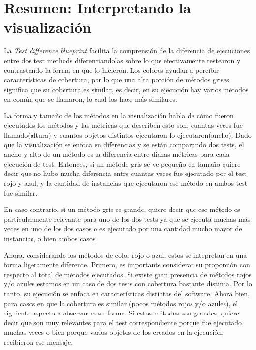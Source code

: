 
\section{Resumen: Interpretando la visualización}


\par La \emph{Test difference blueprint} facilita la comprensión de la diferencia de ejecuciones entre dos test methods diferenciandolas sobre lo que efectivamente testearon y contrastando la forma en que lo hicieron. Los colores ayudan a percibir características de cobertura, por lo que una alta porción de métodos grises significa que su cobertura es similar, es decir, en su ejecución hay varios métodos en común que se llamaron, lo cual los hace más similares.

\par La forma y tamaño de los métodos en la visualización habla de cómo fueron ejecutados los métodos y las métricas que describen esto son: cuantas veces fue llamado(altura) y cuantos objetos distintos ejecutaron lo ejecutaron(ancho). Dado que la visualización se enfoca en diferencias y se están comparando dos tests, el ancho y alto de un método es la diferencia entre dichas métricas para cada ejecución de test. Entonces, si un método gris se ve pequeño en tamaño quiere decir que no hubo mucha diferencia entre cuantas veces fue ejecutado por el test rojo y azul, y la cantidad de instancias que ejecutaron ese método en ambos test fue similar. 

\par En caso contrario, si un método gris es grande, quiere decir que ese método es particularmente relevante para uno de los dos tests ya que se ejecuta muchas más veces en uno de los dos casos o es ejecutado por una cantidad mucho mayor de instancias, o bien ambos casos. 

\par Ahora, considerando los métodos de color rojo o azul, estos se intepretan en una forma ligeramente diferente. Primero, es importante considerar su proporción con respecto al total de métodos ejecutados. Si existe gran presencia de métodos rojos y/o azules estamos en un caso de dos tests con cobertura bastante distinta. Por lo tanto, su ejecución se enfoca en características distintas del software. Ahora bien, para casos en que la cobertura es similar (pocos métodos rojos y/o azules), el siguiente aspecto a observar es su forma. Si estos métodos son grandes, quiere decir que son muy relevantes para el test correspondiente porque fue ejecutado muchas veces o bien porque varios objetos de los creados en la ejecución, recibieron ese mensaje.


